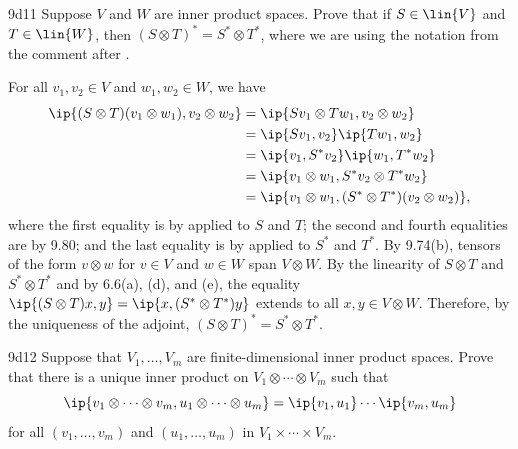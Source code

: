 \begin{exercise}{9d11}
    Suppose $V$ and $W$ are inner product spaces.
    Prove that if $S \in \lin{V}$ and $T \in \lin{W}$, then $(S \otimes T)^\ast = S^\ast \otimes T^\ast$, where we are using the notation from the comment after .
\end{exercise}

\begin{sol}
    For all $v_1, v_2 \in V$ and $w_1, w_2 \in W$, we have
    \begin{align*}
        \ip{(S \otimes T)(v_1 \otimes w_1), v_2 \otimes w_2} &= \ip{Sv_1 \otimes Tw_1, v_2 \otimes w_2} \\
        &= \ip{Sv_1, v_2} \ip{Tw_1, w_2} \\
        &= \ip{v_1, S^\ast v_2} \ip{w_1, T^\ast w_2} \\
        &= \ip{v_1 \otimes w_1, S^\ast v_2 \otimes T^\ast w_2} \\
        &= \ip{v_1 \otimes w_1, (S^\ast \otimes T^\ast)(v_2 \otimes w_2)},
    \end{align*}
    where the first equality is by  applied to $S$ and $T$;
    the second and fourth equalities are by 9.80;
    and the last equality is by  applied to $S^\ast$ and $T^\ast$.
    By 9.74(b), tensors of the form $v \otimes w$ for $v \in V$ and $w \in W$ span $V \otimes W$.
    By the linearity of $S \otimes T$ and $S^\ast \otimes T^\ast$ and by 6.6(a), (d), and (e), the equality $\ip{(S \otimes T)x, y} = \ip{x, (S^\ast \otimes T^\ast)y}$ extends to all $x, y \in V \otimes W$.
    Therefore, by the uniqueness of the adjoint, $(S \otimes T)^\ast = S^\ast \otimes T^\ast$.
\end{sol}

\begin{exercise}{9d12}
    Suppose that $V_1, \ldots, V_m$ are finite-dimensional inner product spaces.
    Prove that there is a unique inner product on $V_1 \otimes \cdots \otimes V_m$ such that
    \[
        \ip{v_1 \otimes \cdots \otimes v_m, u_1 \otimes \cdots \otimes u_m} = \ip{v_1, u_1} \cdots \ip{v_m, u_m}
    \]
    for all $(v_1, \ldots, v_m)$ and $(u_1, \ldots, u_m)$ in $V_1 \times \cdots \times V_m$.

\end{exercise}

